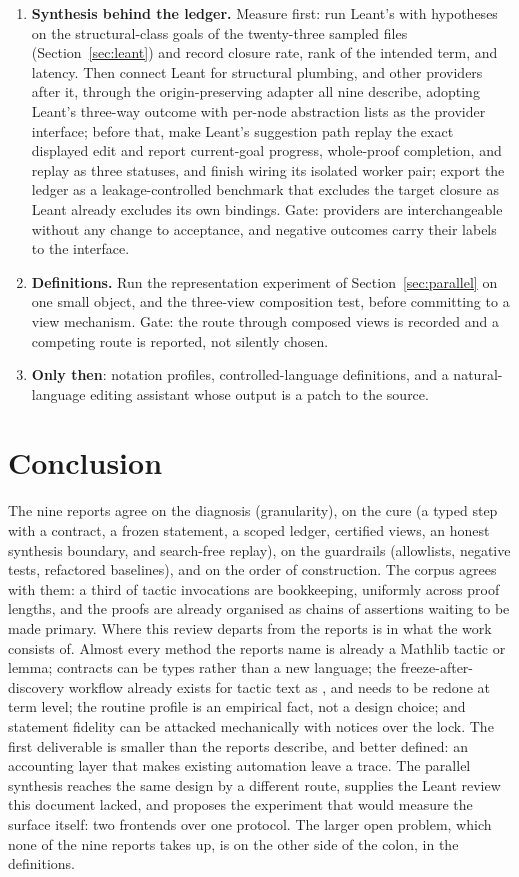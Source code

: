 \documentclass[11pt,a4paper]{article}
\newcommand{\code}[1]{\texttt{\detokenize{#1}}}
\theoremstyle{definition}
\begin{document}
\begin{enumerate}
\item \textbf{Synthesis behind the ledger.} Measure first: run Leant's \code{:synth} with hypotheses on the structural-class goals of the twenty-three sampled files (Section~\ref{sec:leant}) and record closure rate, rank of the intended term, and latency. Then connect Leant for structural plumbing, and other providers after it, through the origin-preserving adapter all nine describe, adopting Leant's three-way outcome with per-node abstraction lists as the provider interface; before that, make Leant's suggestion path replay the exact displayed edit and report current-goal progress, whole-proof completion, and replay as three statuses, and finish wiring its isolated worker pair; export the ledger as a leakage-controlled benchmark that excludes the target closure as Leant already excludes its own \code{it} bindings. Gate: providers are interchangeable without any change to acceptance, and negative outcomes carry their labels to the interface.
\item \textbf{Definitions.} Run the representation experiment of Section~\ref{sec:parallel} on one small object, and the three-view composition test, before committing to a view mechanism. Gate: the route through composed views is recorded and a competing route is reported, not silently chosen.
\item \textbf{Only then}: notation profiles, controlled-language definitions, and a natural-language editing assistant whose output is a patch to the source.
\end{enumerate}

\section{Conclusion}
The nine reports agree on the diagnosis (granularity), on the cure (a typed step with a contract, a frozen statement, a scoped ledger, certified views, an honest synthesis boundary, and search-free replay), on the guardrails (allowlists, negative tests, refactored baselines), and on the order of construction. The corpus agrees with them: a third of tactic invocations are bookkeeping, uniformly across proof lengths, and the proofs are already organised as chains of assertions waiting to be made primary. Where this review departs from the reports is in what the work consists of. Almost every method the reports name is already a Mathlib tactic or lemma; contracts can be types rather than a new language; the freeze-after-discovery workflow already exists for tactic text as \code{says}, and needs to be redone at term level; the routine profile is an empirical fact, not a design choice; and statement fidelity can be attacked mechanically with notices over the lock. The first deliverable is smaller than the reports describe, and better defined: an accounting layer that makes existing automation leave a trace. The parallel synthesis reaches the same design by a different route, supplies the Leant review this document lacked, and proposes the experiment that would measure the surface itself: two frontends over one protocol. The larger open problem, which none of the nine reports takes up, is on the other side of the colon, in the definitions.
\end{document}
